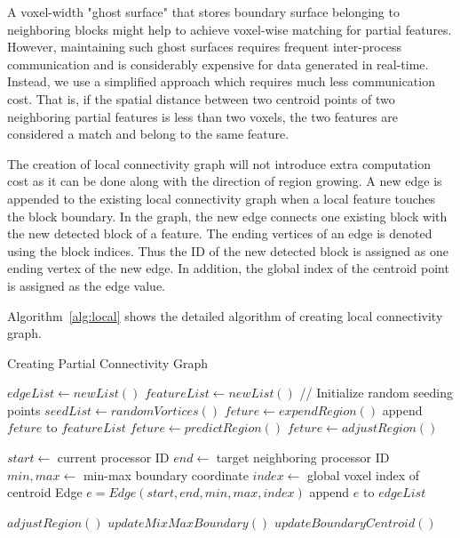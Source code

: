 \documentclass[10pt, conference, compsocconf]{IEEEtran}
\begin{document}
A voxel-width "ghost surface" that stores boundary surface belonging to neighboring blocks might help to achieve voxel-wise matching for partial features. However, maintaining such ghost surfaces requires frequent inter-process communication and is considerably expensive for data generated in real-time. Instead, we use a simplified approach which requires much less communication cost. That is, if the spatial distance between two centroid points of two neighboring partial features is less than two voxels, the two features are considered a match and belong to the same feature.

The creation of local connectivity graph will not introduce extra computation cost as it can be done along with the direction of region growing. A new edge is appended to the existing local connectivity graph when a local feature touches the block boundary. In the graph, the new edge connects one existing block with the new detected block of a feature. The ending vertices of an edge is denoted using the block indices. Thus the ID of the new detected block is assigned as one ending vertex of the new edge. In addition, the global index of the centroid point is assigned as the edge value. 

Algorithm~\ref{alg:local} shows the detailed algorithm of creating local connectivity graph.
\begin{algorithm}
\caption{Creating Partial Connectivity Graph}
\label{alg:local}
\begin{algorithmic}[1]
\STATE $edgeList \leftarrow new List()$
\STATE $featureList \leftarrow new List()$
	\STATE // Initialize random seeding points
	\STATE $seedList \leftarrow randomVortices()$
		\STATE $feture \leftarrow expendRegion()$
		\STATE append $feture$ to $featureList$
	\ENDFOR	
\ELSE
		\STATE $feture \leftarrow predictRegion()$
		\STATE $feture \leftarrow adjustRegion()$	
		
		\STATE $start \leftarrow$ current processor ID
		\STATE $end \leftarrow$ target neighboring processor ID
		\STATE $min,max \leftarrow$ min-max boundary coordinate
		\STATE $index \leftarrow$ global voxel index of centroid
		\STATE Edge $e = Edge(start, end, min, max, index)$
		\STATE append $e$ to $edgeList$
	\ENDFOR
\ENDIF
\end{algorithmic}
\begin{algorithmic} \STATE \end{algorithmic}	%
\begin{algorithmic}[1]
\STATE $adjustRegion()$
		\STATE $updateMixMaxBoundary()$
		\STATE $updateBoundaryCentroid()$
	\ENDIF
\end{algorithmic}
\end{algorithm}
\end{document}
